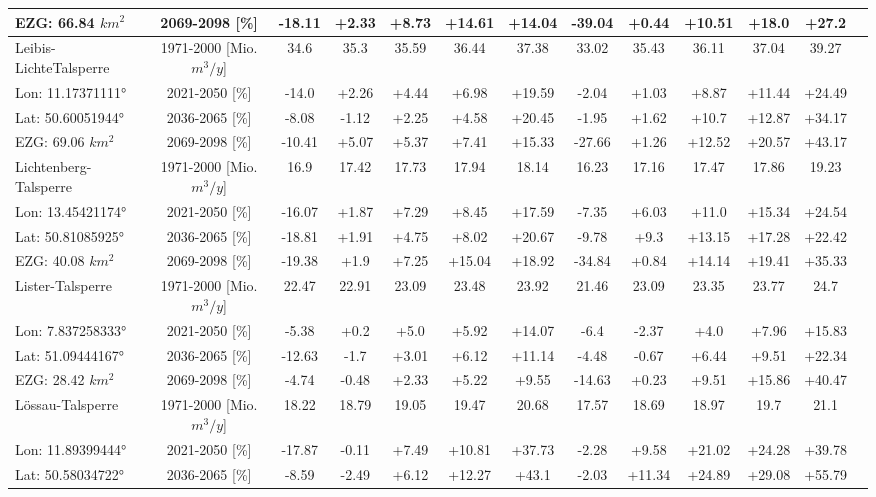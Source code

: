 \begin{longtable}{@{\extracolsep{\fill}}lc|ccccc||cccccc}
EZG: 66.84 $km^2$ & 2069-2098 [\%]  & -18.11 & +2.33 & +8.73 & +14.61 & +14.04 & -39.04 & +0.44 & +10.51 & +18.0 & +27.2 & \\ 
\hline 
Leibis-LichteTalsperre & 1971-2000 [Mio. $m^3/y$]  & 34.6 & 35.3 & 35.59 & 36.44 & 37.38 & 33.02 & 35.43 & 36.11 & 37.04 & 39.27 & \\ 
\cline{2-13} 
Lon: 11.17371111° & 2021-2050 [\%]  & -14.0 & +2.26 & +4.44 & +6.98 & +19.59 & -2.04 & +1.03 & +8.87 & +11.44 & +24.49 & \\ 
Lat: 50.60051944° & 2036-2065 [\%]  & -8.08 & -1.12 & +2.25 & +4.58 & +20.45 & -1.95 & +1.62 & +10.7 & +12.87 & +34.17 & \\ 
EZG: 69.06 $km^2$ & 2069-2098 [\%]  & -10.41 & +5.07 & +5.37 & +7.41 & +15.33 & -27.66 & +1.26 & +12.52 & +20.57 & +43.17 & \\ 
\hline 
Lichtenberg-Talsperre & 1971-2000 [Mio. $m^3/y$]  & 16.9 & 17.42 & 17.73 & 17.94 & 18.14 & 16.23 & 17.16 & 17.47 & 17.86 & 19.23 & \\ 
\cline{2-13} 
Lon: 13.45421174° & 2021-2050 [\%]  & -16.07 & +1.87 & +7.29 & +8.45 & +17.59 & -7.35 & +6.03 & +11.0 & +15.34 & +24.54 & \\ 
Lat: 50.81085925° & 2036-2065 [\%]  & -18.81 & +1.91 & +4.75 & +8.02 & +20.67 & -9.78 & +9.3 & +13.15 & +17.28 & +22.42 & \\ 
EZG: 40.08 $km^2$ & 2069-2098 [\%]  & -19.38 & +1.9 & +7.25 & +15.04 & +18.92 & -34.84 & +0.84 & +14.14 & +19.41 & +35.33 & \\ 
\hline 
Lister-Talsperre & 1971-2000 [Mio. $m^3/y$]  & 22.47 & 22.91 & 23.09 & 23.48 & 23.92 & 21.46 & 23.09 & 23.35 & 23.77 & 24.7 & \\ 
\cline{2-13} 
Lon: 7.837258333° & 2021-2050 [\%]  & -5.38 & +0.2 & +5.0 & +5.92 & +14.07 & -6.4 & -2.37 & +4.0 & +7.96 & +15.83 & \\ 
Lat: 51.09444167° & 2036-2065 [\%]  & -12.63 & -1.7 & +3.01 & +6.12 & +11.14 & -4.48 & -0.67 & +6.44 & +9.51 & +22.34 & \\ 
EZG: 28.42 $km^2$ & 2069-2098 [\%]  & -4.74 & -0.48 & +2.33 & +5.22 & +9.55 & -14.63 & +0.23 & +9.51 & +15.86 & +40.47 & \\ 
\hline 
Lössau-Talsperre & 1971-2000 [Mio. $m^3/y$]  & 18.22 & 18.79 & 19.05 & 19.47 & 20.68 & 17.57 & 18.69 & 18.97 & 19.7 & 21.1 & \\ 
\cline{2-13} 
Lon: 11.89399444° & 2021-2050 [\%]  & -17.87 & -0.11 & +7.49 & +10.81 & +37.73 & -2.28 & +9.58 & +21.02 & +24.28 & +39.78 & \\ 
Lat: 50.58034722° & 2036-2065 [\%]  & -8.59 & -2.49 & +6.12 & +12.27 & +43.1 & -2.03 & +11.34 & +24.89 & +29.08 & +55.79 & \\ 

\end{longtable}
